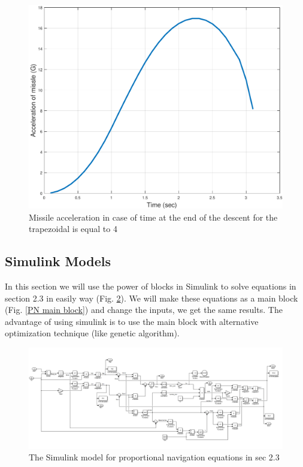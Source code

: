 \begin{figure}[htb]
	\centering
	\includegraphics[scale = 0.75]{fig/MissileAccelerationT3.pdf}
	\caption{Missile acceleration in case of time at the end of the descent for the trapezoidal is equal to 4 }
	\label{missile accelerationT3}
\end{figure}

\subsection{Simulink Models}

In this section we will use the power of blocks in Simulink to solve equations in section 2.3 in easily way (Fig. \ref{PN eq}). We will make these equations as a main block (Fig. \ref{PN main block}) and change the inputs, we get the same results. The advantage of using simulink is to use the main block with alternative optimization technique (like genetic algorithm). 

\begin{landscape}
\begin{figure}[htb]
	\centering
	\includegraphics[scale = 0.70]{fig/PNeq.PNG}
	\caption{The Simulink model for proportional navigation equations in sec 2.3}
	\label{PN eq}
\end{figure}
\end{landscape}


